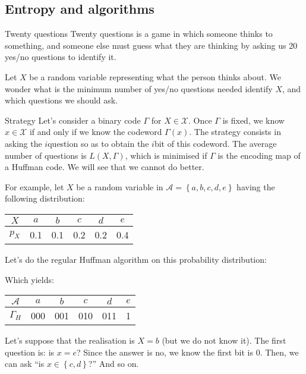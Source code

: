 \documentclass[a4paper]{article}
\begin{document}
\subsection{Entropy and algorithms}
\begin{parag}{Twenty questions}
    Twenty questions is a game in which someone thinks to something, and someone else must guess what they are thinking by asking us 20 yes/no questions to identify it.

    Let $X$ be a random variable representing what the person thinks about. We wonder what is the minimum number of yes/no questions needed identify $X$, and which questions we should ask.

    \begin{subparag}{Strategy}
        Let's consider a binary code $\Gamma$ for $X \in \mathcal{X}$. Once $\Gamma$ is fixed, we know $x \in \mathcal{X}$ if and only if we know the codeword $\Gamma\left(x\right)$. The strategy consists in asking the $i$\Th question so as to obtain the $i$\Th bit of this codeword. The average number of questions is $L\left(X, \Gamma\right)$, which is minimised if $\Gamma$ is the encoding map of a Huffman code. We will see that we cannot do better.

        For example, let $X$ be a random variable in $\mathcal{A} = \left\{a, b, c, d, e\right\}$ having the following distribution:
        \begin{center}
        \begin{tabular}{c|ccccc}
            $X$ & $a$ & $b$ & $c$ & $d$ & $e$ \\
            \hline
            $p_X$ & 0.1 & 0.1 & 0.2 & 0.2 & 0.4
        \end{tabular}
        \end{center}

        Let's do the regular Huffman algorithm on this probability distribution:

        Which yields:
        \begin{center}
        \begin{tabular}{c|ccccc}
            $\mathcal{A}$ & $a$ & $b$ & $c$ & $d$ & $e$ \\
            \hline
            $\Gamma_H$ & 000 & 001 & 010 & 011 & 1
        \end{tabular}
        \end{center}

        Let's suppose that the realisation is $X = b$ (but we do not know it). The first question is: is $x = e$? Since the answer is no, we know the first bit is 0. Then, we can ask ``is $x \in \left\{c, d\right\}$?'' And so on.
    \end{subparag}


\end{parag}
\end{document}
